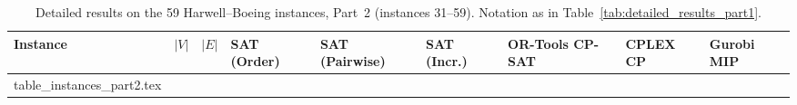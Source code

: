 \documentclass[a4paper,fleqn]{cas-sc}
\makeatletter
\newcommand{\tableinput}[1]{\@@input #1 }
\makeatother
\begin{document}
\begin{table}[pos=htbp]
\centering
\caption{Detailed results on the 59 Harwell--Boeing instances, Part~2 (instances 31--59). Notation as in Table~\ref{tab:detailed_results_part1}.}
\label{tab:detailed_results_part2}
\scriptsize
\begin{tabular*}{\textwidth}{@{\extracolsep{\fill}}lrrllllll@{}}
\toprule
\textbf{Instance} & \textbf{$|V|$} & \textbf{$|E|$} & \textbf{SAT (Order)} & \textbf{SAT (Pairwise)} & \textbf{SAT (Incr.)} & \textbf{OR-Tools CP-SAT} & \textbf{CPLEX CP} & \textbf{Gurobi MIP} \\
\midrule
\tableinput{table_instances_part2.tex}
\bottomrule
\end{tabular*}
\end{table}


\newpage

\end{document}

